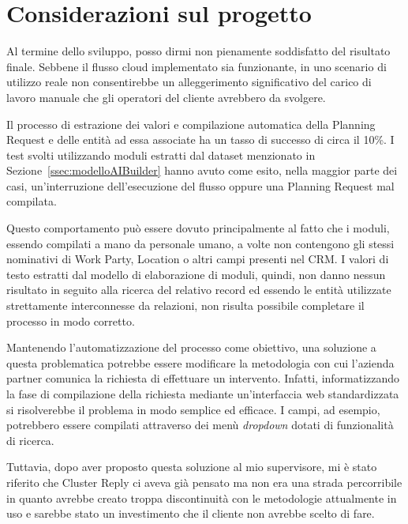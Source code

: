 \section{Considerazioni sul progetto}
Al termine dello sviluppo, posso dirmi non pienamente soddisfatto del risultato finale. Sebbene il flusso cloud implementato sia funzionante, in uno scenario di utilizzo reale non consentirebbe un alleggerimento significativo del carico di lavoro manuale che gli operatori del cliente avrebbero da svolgere. 

Il processo di estrazione dei valori e compilazione automatica della Planning Request e delle entità ad essa associate ha un tasso di successo di circa il \num{10}\%. I test svolti utilizzando moduli estratti dal dataset menzionato in Sezione~\ref{ssec:modelloAIBuilder} hanno avuto come esito, nella maggior parte dei casi, un'interruzione dell'esecuzione del flusso oppure una Planning Request mal compilata. 

Questo comportamento può essere dovuto principalmente al fatto che i moduli, essendo compilati a mano da personale umano, a volte non contengono gli stessi nominativi di Work Party, Location o altri campi presenti nel CRM. I valori di testo estratti dal modello di elaborazione di moduli, quindi, non danno nessun risultato in seguito alla ricerca del relativo record ed essendo le entità utilizzate strettamente interconnesse da relazioni, non risulta possibile completare il processo in modo corretto. 

Mantenendo l'automatizzazione del processo come obiettivo, una soluzione a questa problematica potrebbe essere modificare la metodologia con cui l'azienda partner comunica la richiesta di effettuare un intervento. Infatti, informatizzando la fase di compilazione della richiesta mediante un'interfaccia web standardizzata si risolverebbe il problema in modo semplice ed efficace. I campi, ad esempio, potrebbero essere compilati attraverso dei menù \textit{dropdown} dotati di funzionalità di ricerca.

Tuttavia, dopo aver proposto questa soluzione al mio supervisore, mi è stato riferito che Cluster Reply ci aveva già pensato ma non era una strada percorribile in quanto avrebbe creato troppa discontinuità con le metodologie attualmente in uso e sarebbe stato un investimento che il cliente non avrebbe scelto di fare.
\newpage

